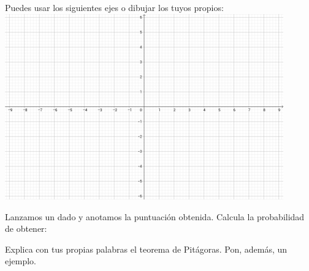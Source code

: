 \documentclass[addpoints,spanish, 12pt,a4paper]{exam}
\begin{document}
\begin{questions}
\addpoints

\question[2] Puedes usar los siguientes ejes o dibujar los tuyos propios:\\
    \includegraphics[width=0.9\textwidth]{ejes}

\noaddpoints %
\addpoints

\question[1] Lanzamos un dado y anotamos la puntuación obtenida. Calcula la probabilidad de obtener:
\noaddpoints %
\addpoints

\question[1]
Explica con tus propias palabras el teorema de Pitágoras. Pon, además, un ejemplo.
\makeemptybox{\fill}


\end{questions}
\end{document}

